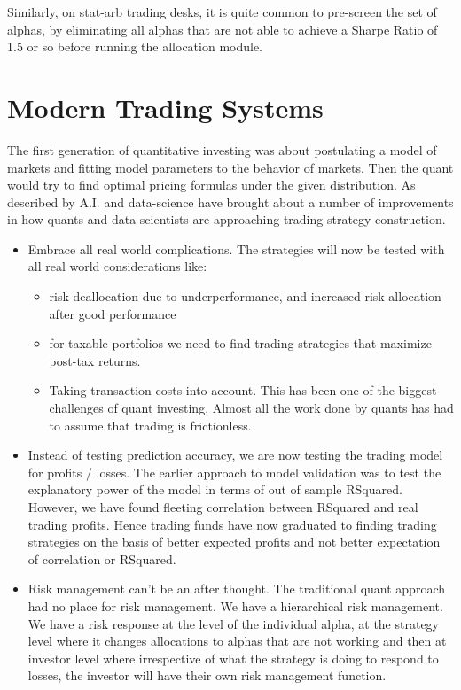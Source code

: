 \documentclass[a4paper]{article}
\begin{document}
Similarly, on stat-arb trading desks, it is quite common to pre-screen the set of alphas, by eliminating all alphas that are not able to achieve a Sharpe Ratio of 1.5 or so before running the allocation module.

\section{Modern Trading Systems\label{modern-trading-systems}}
The first generation of quantitative investing was about postulating a model of markets and fitting model parameters to the behavior of markets. Then the quant would try to find optimal pricing formulas under the given distribution. As described by \cite{GK2000} A.I. and data-science have brought about a number of improvements in how quants and data-scientists are approaching trading strategy construction.
\begin{itemize}
	\item Embrace all real world complications. The strategies will now be tested with all real world considerations like: 
	\begin{itemize}
		\item {} risk-deallocation due to underperformance, and increased risk-allocation after good performance
		\item {} for taxable portfolios we need to find trading strategies that maximize post-tax returns.
		\item {} Taking transaction costs into account. This has been one of the biggest challenges of quant investing. Almost all the work done by quants has had to assume that trading is frictionless.
	\end{itemize}
	\item Instead of testing prediction accuracy, we are now testing the trading model for profits / losses. The earlier approach to model validation was to test the explanatory power of the model in terms of out of sample RSquared. However, we have found fleeting correlation between RSquared and real trading profits. Hence trading funds have now graduated to finding trading strategies on the basis of better expected profits and not better expectation of correlation or RSquared.
	\item Risk management can't be an after thought. The traditional quant approach had no place for risk management. We have a hierarchical risk management. We have a risk response at the level of the individual alpha, at the strategy level where it changes allocations to alphas that are not working and then at investor level where irrespective of what the strategy is doing to respond to losses, the investor will have their own risk management function.
\end{itemize}
\end{document}
